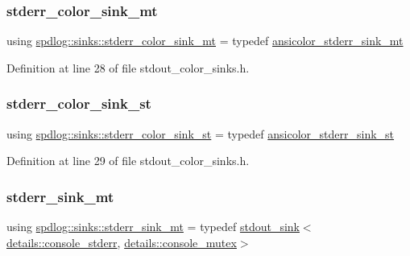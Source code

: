 \subsubsection{\texorpdfstring{stderr\+\_\+color\+\_\+sink\+\_\+mt}{stderr\_color\_sink\_mt}}
{\footnotesize\ttfamily using \hyperlink{namespacespdlog_1_1sinks_a58091bb55dd96f7e29ccc044338c054c}{spdlog\+::sinks\+::stderr\+\_\+color\+\_\+sink\+\_\+mt} = typedef \hyperlink{namespacespdlog_1_1sinks_aa12104ff6999c8908f687c3eb87d827e}{ansicolor\+\_\+stderr\+\_\+sink\+\_\+mt}}



Definition at line 28 of file stdout\+\_\+color\+\_\+sinks.\+h.

\mbox{\label{namespacespdlog_1_1sinks_adf8d38fe4201bc8f4b5255c4fbea7aae}} 
\subsubsection{\texorpdfstring{stderr\+\_\+color\+\_\+sink\+\_\+st}{stderr\_color\_sink\_st}}
{\footnotesize\ttfamily using \hyperlink{namespacespdlog_1_1sinks_adf8d38fe4201bc8f4b5255c4fbea7aae}{spdlog\+::sinks\+::stderr\+\_\+color\+\_\+sink\+\_\+st} = typedef \hyperlink{namespacespdlog_1_1sinks_a3d8d6c5070124583420003b8c00ec441}{ansicolor\+\_\+stderr\+\_\+sink\+\_\+st}}



Definition at line 29 of file stdout\+\_\+color\+\_\+sinks.\+h.

\mbox{\label{namespacespdlog_1_1sinks_afa13b9dbe3db99f4112b17a310dc26de}} 
\subsubsection{\texorpdfstring{stderr\+\_\+sink\+\_\+mt}{stderr\_sink\_mt}}
{\footnotesize\ttfamily using \hyperlink{namespacespdlog_1_1sinks_afa13b9dbe3db99f4112b17a310dc26de}{spdlog\+::sinks\+::stderr\+\_\+sink\+\_\+mt} = typedef \hyperlink{classspdlog_1_1sinks_1_1stdout__sink}{stdout\+\_\+sink}$<$\hyperlink{structspdlog_1_1details_1_1console__stderr}{details\+::console\+\_\+stderr}, \hyperlink{structspdlog_1_1details_1_1console__mutex}{details\+::console\+\_\+mutex}$>$}



